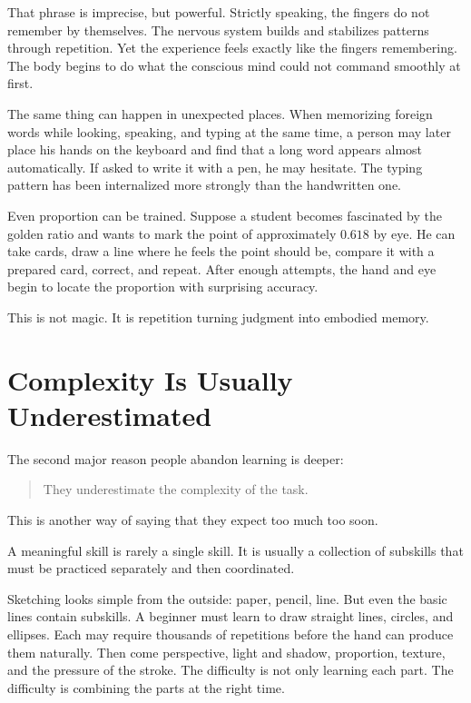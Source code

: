 That phrase is imprecise, but powerful. Strictly speaking, the fingers do not remember by themselves. The nervous system builds and stabilizes patterns through repetition. Yet the experience feels exactly like the fingers remembering. The body begins to do what the conscious mind could not command smoothly at first.

The same thing can happen in unexpected places. When memorizing foreign words while looking, speaking, and typing at the same time, a person may later place his hands on the keyboard and find that a long word appears almost automatically. If asked to write it with a pen, he may hesitate. The typing pattern has been internalized more strongly than the handwritten one.

Even proportion can be trained. Suppose a student becomes fascinated by the golden ratio and wants to mark the point of approximately \(0.618\) by eye. He can take cards, draw a line where he feels the point should be, compare it with a prepared card, correct, and repeat. After enough attempts, the hand and eye begin to locate the proportion with surprising accuracy.

This is not magic. It is repetition turning judgment into embodied memory.

\section*{Complexity Is Usually Underestimated}

The second major reason people abandon learning is deeper:

\begin{quote}
They underestimate the complexity of the task.
\end{quote}

This is another way of saying that they expect too much too soon.

A meaningful skill is rarely a single skill. It is usually a collection of subskills that must be practiced separately and then coordinated.

Sketching looks simple from the outside: paper, pencil, line. But even the basic lines contain subskills. A beginner must learn to draw straight lines, circles, and ellipses. Each may require thousands of repetitions before the hand can produce them naturally. Then come perspective, light and shadow, proportion, texture, and the pressure of the stroke. The difficulty is not only learning each part. The difficulty is combining the parts at the right time.

